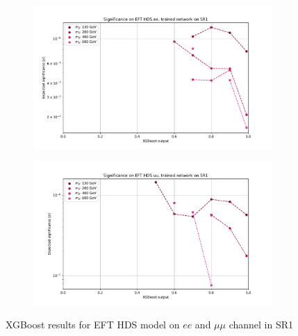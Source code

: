 \documentclass[12pt, a4paper]{book}
\begin{document}
\begin{figure}[!ht]
\begin{subfigure}[b]{0.49\textwidth}
      \includegraphics[width=1\textwidth]{XGBoost/Model_independent/50-100/EFT_HDS/EXP_SIG_ee.pdf}
   \end{subfigure}
   \hfill
   \begin{subfigure}[b]{0.49\textwidth}
      \centering
      \includegraphics[width=1\textwidth]{XGBoost/Model_independent/50-100/EFT_HDS/EXP_SIG_uu.pdf}
   \end{subfigure}
   \caption{XGBoost results for EFT HDS model on $ee$ and $\mu\mu$ channel in SR1}\label{fig:EFT_HDS_SR1}
\end{figure}
\end{document}
